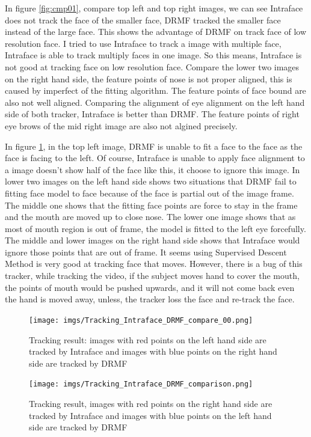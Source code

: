 In figure \ref{fig:cmp01}, compare top left and top right images, we can see Intraface does not track the face of the smaller face, DRMF tracked the smaller face instead of the large face. This shows the advantage of DRMF on track face of low resolution face. I tried to use Intraface to track a image with multiple face, Intraface is able to track multiply faces in one image. So this means, Intraface is not good at tracking face on low resolution face. Compare the lower two images on the right hand side, the feature points of nose is not proper aligned, this is caused by imperfect of the fitting algorithm. The feature points of face bound are also not well aligned. Comparing the alignment of eye alignment on the left hand side of both tracker, Intraface is better than DRMF. The feature points of right eye brows of the mid right image are also not algined precisely.

In figure \ref{fig:cmp02}, in the top left image, DRMF is unable to fit a face to the face as the face is facing to the left. Of course, Intraface is unable to apply face alignment to a image doesn't show half of the face like this, it choose to ignore this image. In lower two images on the left hand side shows two situations that DRMF fail to fitting face model to face because of the face is partial out of the image frame. The middle one shows that the fitting face points are force to stay in the frame and the mouth are moved up to close nose. The lower one image shows that as most of mouth region is out of frame, the model is fitted to the left eye forcefully. The middle and lower images on the right hand side shows that Intraface would ignore those points that are out of frame. It seems using Supervised Descent Method is very good at tracking face that moves. However, there is a bug of this tracker, while tracking the video, if the subject moves hand to cover the mouth, the points of mouth would be pushed upwards, and it will not come back even the hand is moved away, unless, the tracker loss the face and re-track the face.
\begin{figure}
\centering
\texttt{[image: imgs/Tracking\_Intraface\_DRMF\_compare\_00.png]}
\caption{Tracking result: images with red points on the left hand side are tracked by Intraface and images with blue points on the right hand side are tracked by DRMF}
\label{fig:cmp01}
\texttt{[image: imgs/Tracking\_Intraface\_DRMF\_comparison.png]}
\caption{Tracking result, images with red points on the right hand side are tracked by Intraface and images with blue points on the left hand side are tracked by DRMF}
\label{fig:cmp02}
\end{figure}
\newpage
